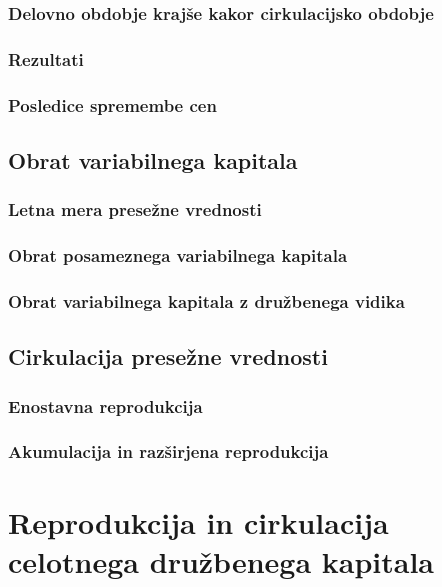 \documentclass[a5paper]{scrbook}
\begin{document}
\section{Delovno obdobje krajše kakor cirkulacijsko obdobje}

\section{Rezultati}

\section{Posledice spremembe cen}

\chapter{Obrat variabilnega kapitala}

\section{Letna mera presežne vrednosti}

\section{Obrat posameznega variabilnega kapitala}

\section{Obrat variabilnega kapitala z družbenega vidika}

\chapter{Cirkulacija presežne vrednosti}

\section{Enostavna reprodukcija}

\section{Akumulacija in razširjena reprodukcija}

\part{Reprodukcija in cirkulacija celotnega družbenega kapitala}
\end{document}
